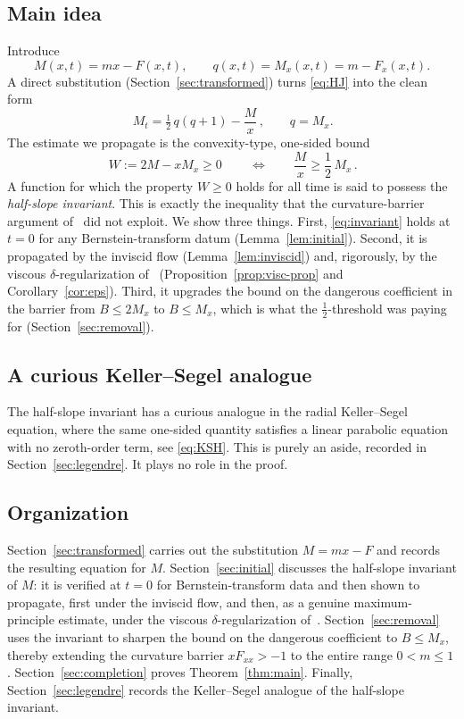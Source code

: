 \documentclass[12pt]{amsart}
\numberwithin{equation}{section}
\theoremstyle{plain}
\theoremstyle{definition}
\begin{document}
\subsection{Main idea}
Introduce
\begin{equation}\label{eq:Mq}
	M(x,t)=mx-F(x,t),\qquad q(x,t)=M_x(x,t)=m-F_x(x,t).
\end{equation}
A direct substitution (Section~\ref{sec:transformed}) turns \eqref{eq:HJ} into
the clean form
\begin{equation}\label{eq:Meq}
	\,M_t=\tfrac12\,q(q+1)-\frac{M}{x}\,,
	\qquad q=M_x .
\end{equation}
The estimate we propagate is the convexity-type, one-sided bound
\begin{equation}\label{eq:invariant}
	\,W:=2M-xM_x \ge 0 \,
	\qquad\Longleftrightarrow\qquad
	\frac{M}{x}\ge\frac12\,M_x\,.
\end{equation}
A function for which the property $W\ge0$ holds for all time is said to
possess the \emph{half-slope invariant}.
This is exactly the inequality that the curvature-barrier
argument of~\cite{TV} did not exploit. We show three things. First,
\eqref{eq:invariant} holds at $t=0$ for any
Bernstein-transform datum (Lemma~\ref{lem:initial}). Second, it is
propagated by the
inviscid flow (Lemma~\ref{lem:inviscid}) and, rigorously, by the viscous
$\delta$-regularization of~\cite{TV} (Proposition~\ref{prop:visc-prop} and
Corollary~\ref{cor:eps}). Third, it upgrades the bound on the dangerous
coefficient in the barrier from $B\le2M_x$ to $B\le M_x$, which is what the
$\tfrac12$-threshold was paying for (Section~\ref{sec:removal}).

\subsection{A curious Keller--Segel analogue}
The half-slope invariant has a curious analogue in the radial Keller--Segel
equation, where the same one-sided quantity satisfies a linear parabolic
equation with no zeroth-order term, see \eqref{eq:KSH}. This is
purely an aside, recorded in
Section~\ref{sec:legendre}. It plays no role in the proof.

\subsection{Organization}
Section~\ref{sec:transformed} carries out the substitution $M=mx-F$ and records
the resulting equation for $M$. Section~\ref{sec:initial} discusses the
half-slope invariant of $M$: it is verified at $t=0$ for
Bernstein-transform data and
then shown to propagate, first under the inviscid flow, and then, as a genuine
maximum-principle estimate, under the viscous $\delta$-regularization
of~\cite{TV}. Section~\ref{sec:removal} uses the invariant to sharpen the bound
on the dangerous coefficient to $B\le M_x$, thereby extending the curvature
barrier $xF_{xx}>-1$ to the entire range $0<m\le1$.
Section~\ref{sec:completion} proves Theorem~\ref{thm:main}. Finally,
Section~\ref{sec:legendre} records the Keller--Segel analogue of the half-slope
invariant.
\end{document}
